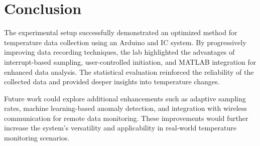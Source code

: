 \documentclass[journal]{IEEEtran}
\begin{document}
\section{Conclusion}
The experimental setup successfully demonstrated an optimized method for temperature data collection using an Arduino and IC system. By progressively improving data recording techniques, the lab highlighted the advantages of interrupt-based sampling, user-controlled initiation, and MATLAB integration for enhanced data analysis. The statistical evaluation reinforced the reliability of the collected data and provided deeper insights into temperature changes.

Future work could explore additional enhancements such as adaptive sampling rates, machine learning-based anomaly detection, and integration with wireless communication for remote data monitoring. These improvements would further increase the system’s versatility and applicability in real-world temperature monitoring scenarios.
\end{document}
